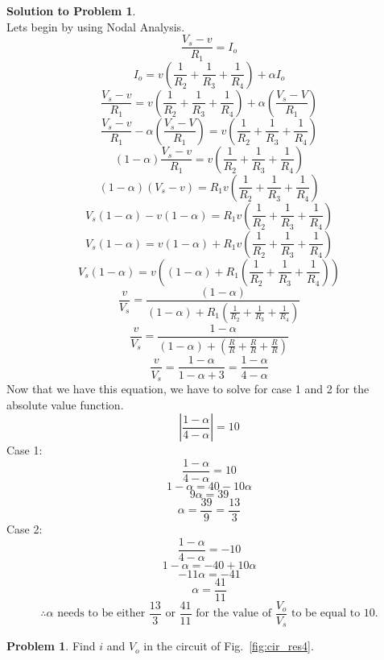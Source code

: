 \documentclass[11pt,letterpaper]{article}
\theoremstyle{definition}
\newtheorem{prob}{\textcolor{problemcolor}{Problem}}  %
\newtheorem{solprob}{\textcolor{solproblemcolor}{Solution to Problem}}  %
\begin{document}
\noindent\makebox[\linewidth]{\color{rouge_poly}{\rule{\textwidth}{1.3pt}}}

\begin{solprob} \text{}\\
    Lets begin by using Nodal Analysis.
    \[\frac{V_s-v}{R_1} = I_o\]
    \[I_o = v(\frac{1}{R_2} + \frac{1}{R_3} + \frac{1}{R_4}) + \alpha I_o\]
    \[\frac{V_s-v}{R_1} = v(\frac{1}{R_2} + \frac{1}{R_3} + \frac{1}{R_4}) + \alpha (\frac{V_s-V}{R_1})\]
    \[\frac{V_s-v}{R_1} - \alpha (\frac{V_s-V}{R_1}) = v(\frac{1}{R_2} + \frac{1}{R_3} + \frac{1}{R_4})\]
    \[(1-\alpha)\frac{V_s-v}{R_1} = v(\frac{1}{R_2} + \frac{1}{R_3} + \frac{1}{R_4})\]
    \[(1-\alpha)(V_s-v) = R_1v(\frac{1}{R_2} + \frac{1}{R_3} + \frac{1}{R_4})\]
    \[V_s(1-\alpha)-v(1-\alpha) = R_1v(\frac{1}{R_2} + \frac{1}{R_3} + \frac{1}{R_4})\]
    \[V_s(1-\alpha) = v(1-\alpha) + R_1v(\frac{1}{R_2} + \frac{1}{R_3} + \frac{1}{R_4})\]
    \[V_s(1-\alpha) = v((1-\alpha) + R_1(\frac{1}{R_2} + \frac{1}{R_3} + \frac{1}{R_4}))\]
    \[\frac{v}{V_s} = \frac{(1-\alpha)}{(1-\alpha) + R_1(\frac{1}{R_2} + \frac{1}{R_3} + \frac{1}{R_4})}\]
    \[\frac{v}{V_s} = \frac{1-\alpha}{(1-\alpha) + (\frac{R}{R} + \frac{R}{R} + \frac{R}{R})}\]
    \[\frac{v}{V_s} = \frac{1-\alpha}{1-\alpha + 3} = \frac{1-\alpha}{4-\alpha}\]
    Now that we have this equation, we have to solve for case 1 and 2 for the absolute value function.
    \[|\frac{1-\alpha}{4-\alpha}| = 10\]
    Case 1:
    \[\frac{1-\alpha}{4-\alpha} = 10\]
    \[1-\alpha = 40-10\alpha\]
    \[9\alpha = 39\]
    \[\alpha = \frac{39}{9} = \frac{13}{3}\]
    Case 2:
    \[\frac{1-\alpha}{4-\alpha} = -10\]
    \[1-\alpha = -40 + 10\alpha\]
    \[-11\alpha = -41\]
    \[\alpha = \frac{41}{11}\]
    \[\therefore \text{$\alpha$ needs to be either $\frac{13}{3}$ or $\frac{41}{11}$ for the value of $\frac{V_o}{V_s}$ to be equal to 10.}\]
\end{solprob}

\noindent\makebox[\linewidth]{\color{rouge_poly}{\rule{\textwidth}{1.3pt}}}	

\begin{prob}\label{pb:p15}
	Find $i$ and $V_o$ in the circuit of Fig.~\ref{fig:cir_res4}.
\end{prob}
\end{document}

